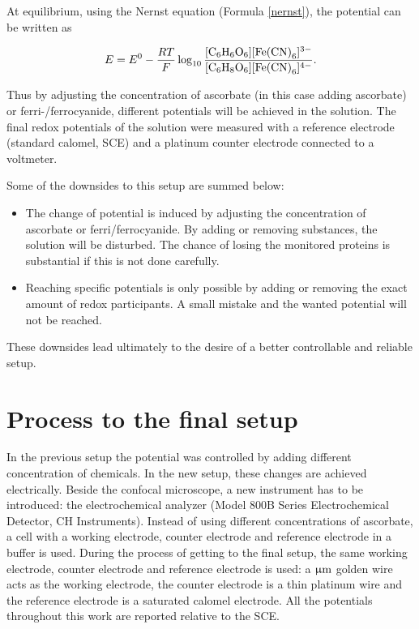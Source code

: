 \documentclass[twoside,single]{lion-msc}
\begin{document}
At equilibrium, using the Nernst equation (Formula \ref{nernst}), the potential can be written as

\begin{equation}
E = E^{0} - \frac{RT}{F} \log_{10} \frac{[\textup{C}_{6}\textup{H}_{6}\textup{O}_{6}][\textup{Fe(CN)}_{6}]^{3-}}{[\textup{C}_{6}\textup{H}_{8}\textup{O}_{6}][\textup{Fe(CN)}_{6}]^{4-}}.
\end{equation}

Thus by adjusting the concentration of ascorbate (in this case adding ascorbate) or ferri-/ferrocyanide, different potentials will be achieved in the solution. The final redox potentials of the solution were measured with a reference electrode (standard calomel, SCE) and a platinum counter electrode connected to a voltmeter.

Some of the downsides to this setup are summed below:
\begin{itemize}
\item The change of potential is induced by adjusting the concentration of ascorbate or ferri/ferrocyanide. By adding or removing substances, the solution will be disturbed. The chance of losing the monitored proteins is substantial if this is not done carefully. 
\item Reaching specific potentials is only possible by adding or removing the exact amount of redox participants. A small mistake and the wanted potential will not be reached. 
\end{itemize}

These downsides lead ultimately to the desire of a better controllable and reliable setup. 

\section{Process to the final setup}

In the previous setup the potential was controlled by adding different concentration of chemicals. In the new setup, these changes are achieved electrically. Beside the confocal microscope, a new instrument has to be introduced: the electrochemical analyzer (Model 800B Series Electrochemical Detector, CH Instruments). Instead of using different concentrations of ascorbate, a cell with a working electrode, counter electrode and reference electrode in a buffer is used. During the process of getting to the final setup, the same working electrode, counter electrode and reference electrode is used: a $\upmu \textup{m}$ golden wire acts as the working electrode, the counter electrode is a  thin platinum wire and the reference electrode is a saturated calomel electrode. All the potentials throughout this work are reported relative to the SCE.
\end{document}
